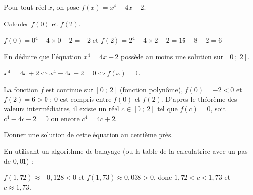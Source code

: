 \documentclass[11pt,a4paper]{article}  %
\begin{document}

Pour tout réel $x$, on pose $f(x)=x^4-4x-2$.
\begin{enumMet}
	\item {} Calculer $f(0)$ et $f(2)$.
	\begin{corrBox}
		$f(0)=0^4-4\times 0-2=-2$ et $f(2)=2^4-4\times 2-2=16-8-2=6$
	\end{corrBox}
	\item {} En déduire que l'équation $x^4=4x+2$ possède au moins une solution sur $[0\ ;\ 2]$.
	\begin{corrBox}
		$x^4=4x+2 \iff x^4-4x-2=0 \iff f(x)=0$.

		La fonction $f$ est continue sur $[0\ ;\ 2]$ (fonction polynôme), $f(0)=-2<0$ et $f(2)=6>0$ : $0$ est compris entre $f(0)$ et $f(2)$. D'après le théorème des valeurs intermédiaires, il existe un réel $c \in[0\ ;\ 2]$ tel que $f(c)=0$, soit $c^4-4c-2=0$ ou encore $c^4=4c+2$.
	\end{corrBox}
	\item {} Donner une solution de cette équation au centième près.
	\begin{corrBox}
		En utilisant un algorithme de balayage (ou la table de la calculatrice avec un pas de $0{,}01$) :

		$f(1{,}72)\approx -0{,}128<0$ et $f(1{,}73)\approx 0{,}038>0$, donc $1{,}72<c<1{,}73$ et $c \approx 1{,}73$.
	\end{corrBox}
\end{enumMet}

\end{document}
